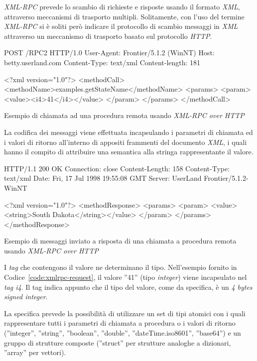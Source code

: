 \emph{XML-RPC} prevede lo scambio di richieste e risposte usando il formato \emph{XML}, attraverso meccanismi di trasporto multipli. Solitamente, con l'uso del termine \emph{XML-RPC} si è soliti però indicare il protocollo di scambio messaggi in \emph{XML} attraverso un meccanismo di trasporto basato sul protocollo \emph{HTTP}.

\begin{program}
\begin{verbatimtab}

POST /RPC2 HTTP/1.0
User-Agent: Frontier/5.1.2 (WinNT)
Host: betty.userland.com
Content-Type: text/xml
Content-length: 181


<?xml version="1.0"?>
<methodCall>
   <methodName>examples.getStateName</methodName>
   <params>
      <param>
         <value><i4>41</i4></value>
         </param>
      </params>
   </methodCall>
\end{verbatimtab}
\caption{Esempio di chiamata ad una procedura remota usando \emph{XML-RPC over HTTP}}\label{code:xmlrpc-request}
\end{program}

La codifica dei messaggi viene effettuata incapsulando i parametri di chiamata ed i valori di ritorno all'interno di appositi frammenti del documento \emph{XML}, i quali hanno il compito di attribuire una semantica alla stringa rappresentante il valore.

\begin{program}
\begin{verbatimtab}
HTTP/1.1 200 OK
Connection: close
Content-Length: 158
Content-Type: text/xml
Date: Fri, 17 Jul 1998 19:55:08 GMT
Server: UserLand Frontier/5.1.2-WinNT


<?xml version="1.0"?>
<methodResponse>
   <params>
      <param>
         <value><string>South Dakota</string></value>
         </param>
      </params>
   </methodResponse>
\end{verbatimtab}
\caption{Esempio di messaggi inviato a risposta di una chiamata a procedura remota usando \emph{XML-RPC over HTTP}}\label{code:xmlrpc-response}
\end{program}

I \emph{tag} che contengono il valore ne determinano il tipo. Nell'esempio fornito in Codice~\ref{code:xmlrpc-request}, il valore ''41'' (tipo \emph{integer}) viene incapsulato nel \emph{tag i4}. Il tag indica appunto che il tipo del valore, come da specifica, è un \emph{4 bytes signed integer}.

La specifica prevede la possibilità di utilizzare un set di tipi atomici con i quali rappresentare tutti i parametri di chiamata a procedura o i valori di ritorno (''integer'', ''string'', ''boolean'', ''double'', ''dateTime.iso8601'', ''base64'') e un gruppo di strutture composte (''struct'' per strutture analoghe a dizionari, ''array'' per vettori).~\cite{xmlrpcspec}
